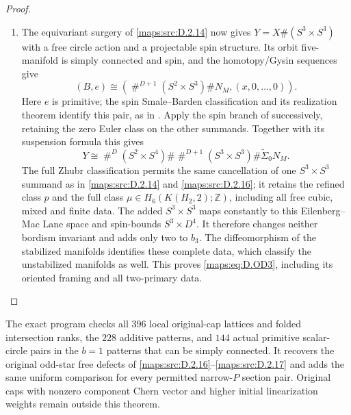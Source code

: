 \begin{proof}
\begin{enumerate}[label=\arabic*.,leftmargin=*]
\item The equivariant surgery of \ref{maps:src:D.2.14} now gives
$Y=X\#(S^3\times S^3)$ with a free circle action and a
projectable spin structure. Its orbit five-manifold is
simply connected and spin, and the homotopy/Gysin sequences
give
\[
 (B,e)\cong
 \left(\mathop{\#}^{D+1}(S^2\times S^3)\#N_M,
                        (x,0,\ldots,0)\right).
\]
Here $e$ is primitive; the spin Smale--Barden classification
and its realization theorem identify this pair, as in
\cite[Theorems 2.2--2.3]{manBarden65}.
Apply the spin branch of \cite[Theorem A]{manGR25}
successively, retaining the zero Euler class on the other
summands. Together with its suspension formula this gives
\[
 Y\cong\mathop{\#}^{D}(S^2\times S^4)
       \#\mathop{\#}^{D+1}(S^3\times S^3)
       \#\widetilde\Sigma_0N_M.
\]
The full Zhubr classification permits the same cancellation
of one $S^3\times S^3$ summand as in \ref{maps:src:D.2.14} and \ref{maps:src:D.2.16};
it retains the refined class $p$ and the full class
$\mu\in H_6(K(H_2,2);\mathbb Z)$, including all free cubic,
mixed and finite data. The added $S^3\times S^3$ maps
constantly to this Eilenberg--Mac Lane space and spin-bounds
$S^3\times D^4$. It therefore changes neither bordism
invariant and adds only two to $b_3$. The diffeomorphism of
the stabilized manifolds identifies these complete data,
which classify the unstabilized manifolds as well.
This proves \eqref{maps:eq:D.OD3}, including its oriented framing and
all two-primary data.
\end{enumerate}
\end{proof}

The exact program 
checks all $396$ local original-cap lattices and folded
intersection ranks, the $228$ additive patterns, and $144$
actual primitive scalar-circle pairs in the $b=1$ patterns
that can be simply connected. It recovers the original
odd-star free defects of \ref{maps:src:D.2.16}--\ref{maps:src:D.2.17} and adds the same uniform
comparison for every permitted narrow-$P$ section pair.
Original caps with nonzero component Chern vector and higher
initial linearization weights remain outside this theorem.



